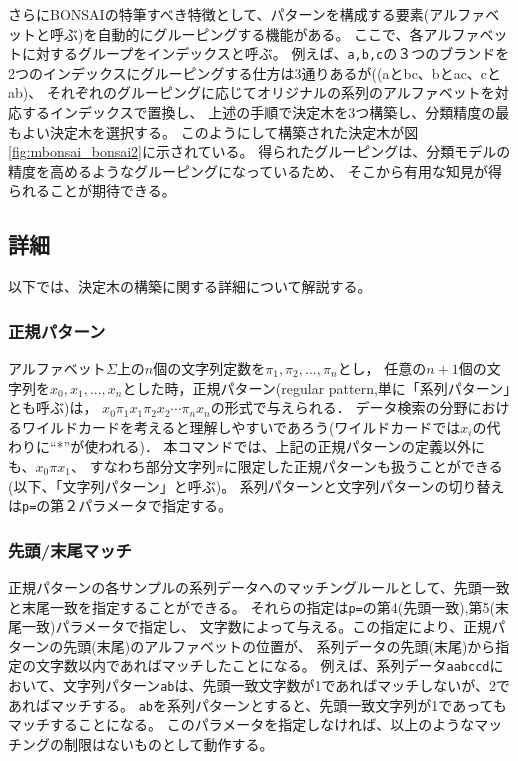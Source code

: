 さらにBONSAIの特筆すべき特徴として、パターンを構成する要素(アルファベットと呼ぶ)を自動的にグルーピングする機能がある。
ここで、各アルファベットに対するグループをインデックスと呼ぶ。
例えば、\verb|a,b,c|の３つのブランドを2つのインデックスにグルーピングする仕方は3通りあるが((aとbc、bとac、cとab)、
それぞれのグルーピングに応じてオリジナルの系列のアルファベットを対応するインデックスで置換し、%
上述の手順で決定木を3つ構築し、分類精度の最もよい決定木を選択する。
このようにして構築された決定木が図\ref{fig:mbonsai_bonsai2}に示されている。
得られたグルーピングは、分類モデルの精度を高めるようなグルーピングになっているため、
そこから有用な知見が得られることが期待できる。


\subsection{詳細}
以下では、決定木の構築に関する詳細について解説する。
\subsubsection{正規パターン}
アルファベット$\Sigma$上の$n$個の文字列定数を$\pi_1, \pi_2, ..., \pi_n$とし，
任意の$n+1$個の文字列を$x_0, x_1, ..., x_n$とした時，正規パターン(regular pattern,単に「系列パターン」とも呼ぶ)は，
$x_0\pi_1x_1\pi_2x_2 \cdots \pi_nx_n$の形式で与えられる．
データ検索の分野におけるワイルドカードを考えると理解しやすいであろう(ワイルドカードでは$x_i$の代わりに``*''が使われる)．
本コマンドでは、上記の正規パターンの定義以外にも、$x_0\pi x_1$、
すなわち部分文字列$\pi$に限定した正規パターンも扱うことができる(以下、「文字列パターン」と呼ぶ)。
系列パターンと文字列パターンの切り替えは\verb|p=|の第２パラメータで指定する。

\subsubsection{先頭/末尾マッチ}
正規パターンの各サンプルの系列データへのマッチングルールとして、先頭一致と末尾一致を指定することができる。
それらの指定は\verb|p=|の第4(先頭一致),第5(末尾一致)パラメータで指定し、
文字数によって与える。この指定により、正規パターンの先頭(末尾)のアルファベットの位置が、
系列データの先頭(末尾)から指定の文字数以内であればマッチしたことになる。
例えば、系列データ\verb|aabccd|において、文字列パターン\verb|ab|は、先頭一致文字数が1であればマッチしないが、2であればマッチする。
\verb|ab|を系列パターンとすると、先頭一致文字列が1であってもマッチすることになる。
このパラメータを指定しなければ、以上のようなマッチングの制限はないものとして動作する。

